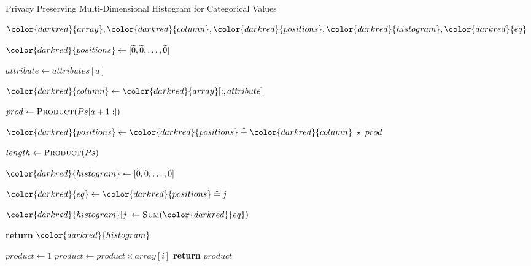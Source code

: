 \begin{algorithm}[H]
\caption{Privacy Preserving Multi-Dimensional Histogram for Categorical Values}\label{a:multidim-histogram-categorical}
\begin{algorithmic}[1]
\renewcommand{\algorithmicrequire}{\textbf{Private Vars:}}
\Require ${\color{darkred}{array}}, {\color{darkred}{column}}, {\color{darkred}{positions}}, {\color{darkred}{histogram}}, {\color{darkred}{eq}}$


    \State
    ${\color{darkred}{positions}} \gets [\enc{0}, \enc{0}, \dots, \enc{0}] $


      \State $attribute \gets attributes[a]$

      \State ${\color{darkred}{column}} \gets {\color{darkred}{array}}[:, attribute]$ 

      \State $prod \gets \textsc{Product}(Ps[a+1:])$ 

      \State ${\color{darkred}{positions}} \gets {\color{darkred}{positions}} \hplus {\color{darkred}{column}} \hmul prod$

    \EndFor

    \State $length \gets \textsc{Product}(Ps)$

    \State ${\color{darkred}{histogram}} \gets [\enc{0}, \enc{0}, \dots, \enc{0}]$



      \State ${\color{darkred}{eq}} \gets {\color{darkred}{positions}} \heq j$

      \State ${\color{darkred}{histogram}}[j] \gets \textsc{Sum}({\color{darkred}{eq}})$

    \EndFor

    \State \textbf{return} {${\color{darkred}{histogram}}$}
\EndProcedure

\begin{spacing}{0.5}
\end{spacing}

    \State $product \gets 1$
        \State $product \gets product \times array[i]$
    \EndFor
    \State \textbf{return} {$product$}
\EndProcedure

\end{algorithmic}
\end{algorithm}
